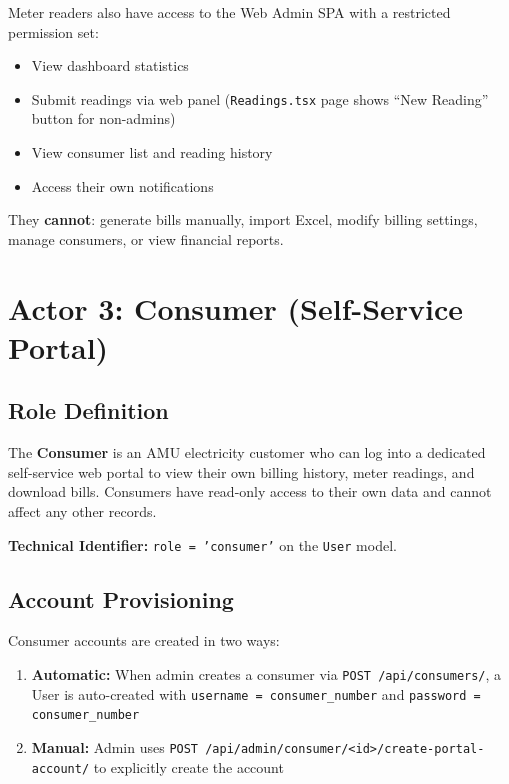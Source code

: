 \documentclass[12pt, a4paper]{report}
\newenvironment{featurelist}{%
    \begin{itemize}[leftmargin=1.5em, itemsep=2pt, parsep=0pt]
}{%
    \end{itemize}
}
\begin{document}
Meter readers also have access to the Web Admin SPA with a restricted permission set:
\begin{featurelist}
    \item View dashboard statistics
    \item Submit readings via web panel (\texttt{Readings.tsx} page shows ``New Reading'' button for non-admins)
    \item View consumer list and reading history
    \item Access their own notifications
\end{featurelist}

They \textbf{cannot}: generate bills manually, import Excel, modify billing settings, manage consumers, or view financial reports.

\chapter{Actor 3: Consumer (Self-Service Portal)}

\section{Role Definition}

The \textbf{Consumer} is an AMU electricity customer who can log into a dedicated self-service web portal to view their own billing history, meter readings, and download bills. Consumers have read-only access to their own data and cannot affect any other records.

\textbf{Technical Identifier:} \texttt{role = 'consumer'} on the \texttt{User} model.

\section{Account Provisioning}

Consumer accounts are created in two ways:
\begin{enumerate}[leftmargin=1.8em]
    \item \textbf{Automatic:} When admin creates a consumer via \texttt{POST /api/consumers/}, a User is auto-created with \texttt{username = consumer\_number} and \texttt{password = consumer\_number}
    \item \textbf{Manual:} Admin uses \texttt{POST /api/admin/consumer/<id>/create-portal-account/} to explicitly create the account
\end{enumerate}
\end{document}
